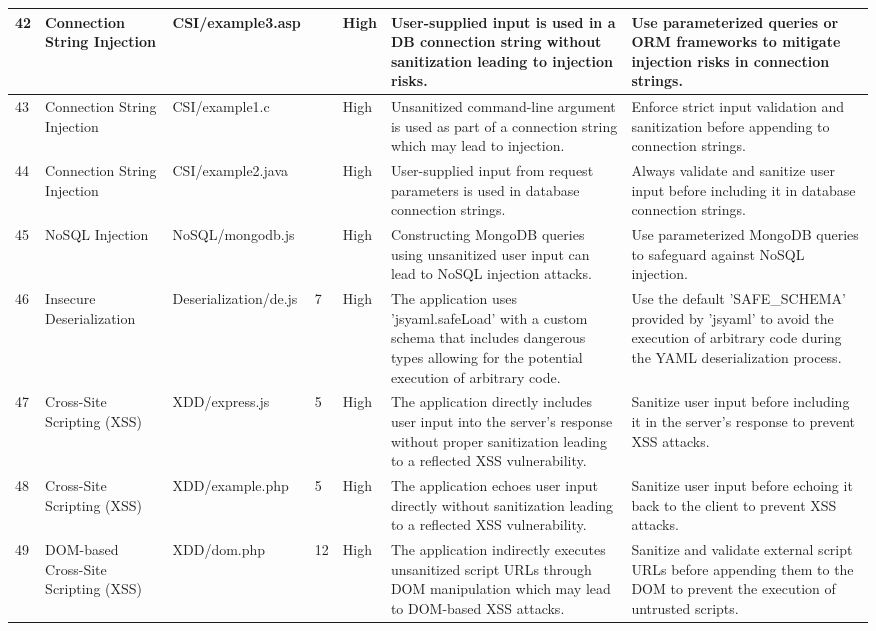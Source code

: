 \begin{landscape}
\begin{table}[H]
{\begin{tabular}{|l|p{4cm}|p{3cm}|p{2cm}|p{1.5cm}|p{12cm}|p{9cm}|}
      42 & Connection String Injection & CSI/example3.asp & ~ & High & User-supplied input is used in a DB connection string without sanitization leading to injection risks. & Use parameterized queries or ORM frameworks to mitigate injection risks in connection strings. \\ \hline
      43 & Connection String Injection & CSI/example1.c & ~ & High & Unsanitized command-line argument is used as part of a connection string which may lead to injection. & Enforce strict input validation and sanitization before appending to connection strings. \\ \hline
      44 & Connection String Injection & CSI/example2.java & ~ & High & User-supplied input from request parameters is used in database connection strings. & Always validate and sanitize user input before including it in database connection strings.  \\ \hline
      45 & NoSQL Injection & NoSQL/mongodb.js & ~ & High & Constructing MongoDB queries using unsanitized user input can lead to NoSQL injection attacks. & Use parameterized MongoDB queries to safeguard against NoSQL injection.  \\ \hline
      46 & Insecure Deserialization & Deserialization/de.js & 7 & High & The application uses 'jsyaml.safeLoad' with a custom schema that includes dangerous types allowing for the potential execution of arbitrary code. & Use the default 'SAFE\_SCHEMA' provided by 'jsyaml' to avoid the execution of arbitrary code during the YAML deserialization process. \\ \hline
      47 & Cross-Site Scripting (XSS) & XDD/express.js & 5 & High & The application directly includes user input into the server's response without proper sanitization leading to a reflected XSS vulnerability. & Sanitize user input before including it in the server's response to prevent XSS attacks. \\ \hline
      48 & Cross-Site Scripting (XSS) & XDD/example.php & 5 & High & The application echoes user input directly without sanitization leading to a reflected XSS vulnerability. & Sanitize user input before echoing it back to the client to prevent XSS attacks. \\ \hline
      49 & DOM-based Cross-Site Scripting (XSS) & XDD/dom.php & 12 & High & The application indirectly executes unsanitized script URLs through DOM manipulation which may lead to DOM-based XSS attacks. & Sanitize and validate external script URLs before appending them to the DOM to prevent the execution of untrusted scripts. \\ \hline

\end{tabular}}
\end{table}
\end{landscape}
